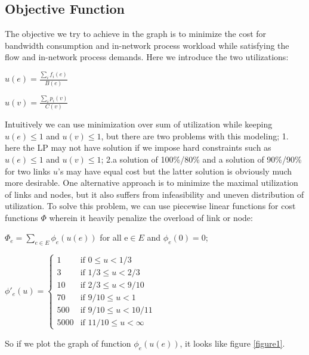 \documentclass{sig-alternate}
\begin{document}
\subsection{Objective Function}
The objective we try to achieve in the graph is to minimize the cost for bandwidth consumption and in-network process workload while satisfying the flow and in-network process demands. Here we introduce the two utilizations: 
\newline

$u(e) = \frac{\sum\limits_{i} f_{i}(e) } {B(e)}$ \newline

$u(v) = \frac{\sum\limits_{i} p_i(v) } {C(v)} $ \newline 

Intuitively we can use minimization over sum of utilization while keeping $u(e)\leq 1$ and $u(v)\leq 1$, but there are two problems with this modeling; 1. here the LP may not have solution if we impose hard constraints such as $u(e)\leq 1$ and $u(v)\leq 1$; 2.a solution of 100\%/80\% and a solution of 90\%/90\% for two links $u$'s may have equal cost but the latter solution is obviously much more desirable. One alternative approach is to minimize the maximal utilization of links and nodes, but it also suffers from infeasibility and uneven distribution of utilization. To solve this problem, we can use piecewise linear functions for cost functions $\Phi$ wherein it heavily penalize the overload of link or node\cite{infocom2000}:
 
 $\Phi_e = \sum\limits_{e\in E} \phi_e(u (e) )$ for all e$\in E$ and $ \phi_e(0)=0$; 
 
$
\phi'_e(u )=
\left\{
	\begin{array}{ll}
		1  & \mbox{if } 0\leq u <1/3 \\
		3 & \mbox{if } 1/3\leq u < 2/3 \\
		10 & \mbox{if } 2/3\leq u < 9/10 \\
		70 & \mbox{if } 9/10\leq u < 1\\
		500 & \mbox{if } 9/10\leq u < 10/11\\
		5000 & \mbox{if } 11/10\leq u < \infty
	\end{array}
\right.
$

So if we plot the graph of function $\phi_e(u (e) )$, it looks like figure \ref{figure1}.
\end{document}
